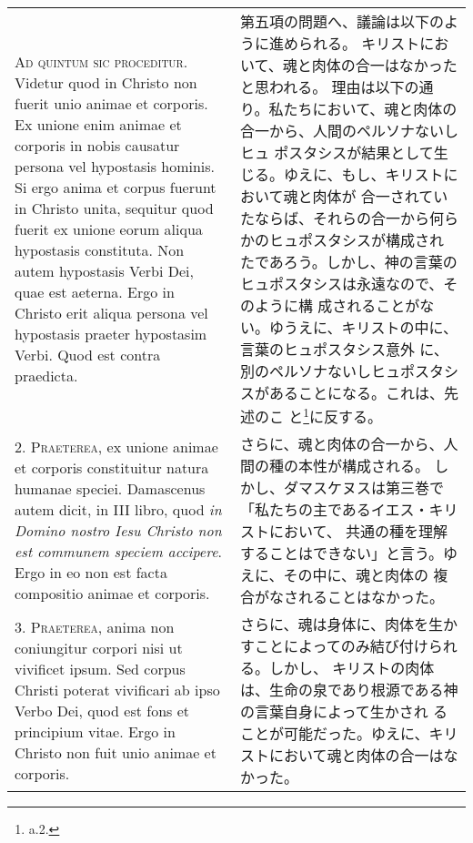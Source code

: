 \documentclass[10pt]{jsarticle} %
\begin{document}
\begin{longtable}{p{21em}p{21em}}


{\Huge A}{\scshape d quintum sic proceditur}. Videtur quod in Christo non fuerit unio
animae et corporis. Ex unione enim animae et corporis in nobis causatur
persona vel hypostasis hominis. Si ergo anima et corpus fuerunt in
Christo unita, sequitur quod fuerit ex unione eorum aliqua hypostasis
constituta. Non autem hypostasis Verbi Dei, quae est aeterna. Ergo in
Christo erit aliqua persona vel hypostasis praeter hypostasim
Verbi. Quod est contra praedicta.


&

第五項の問題へ、議論は以下のように進められる。
キリストにおいて、魂と肉体の合一はなかったと思われる。
理由は以下の通り。私たちにおいて、魂と肉体の合一から、人間のペルソナないしヒュ
 ポスタシスが結果として生じる。ゆえに、もし、キリストにおいて魂と肉体が
 合一されていたならば、それらの合一から何らかのヒュポスタシスが構成され
 たであろう。しかし、神の言葉のヒュポスタシスは永遠なので、そのように構
 成されることがない。ゆうえに、キリストの中に、言葉のヒュポスタシス意外
 に、別のペルソナないしヒュポスタシスがあることになる。これは、先述のこ
 と\footnote{a.2.}に反する。


\\



2. {\scshape Praeterea}, ex unione animae et corporis constituitur natura humanae
speciei. Damascenus autem dicit, in III libro, quod {\itshape in Domino nostro
Iesu Christo non est communem speciem accipere}. Ergo in eo non est facta
compositio animae et corporis.


&


さらに、魂と肉体の合一から、人間の種の本性が構成される。
しかし、ダマスケヌスは第三巻で「私たちの主であるイエス・キリストにおいて、
 共通の種を理解することはできない」と言う。ゆえに、その中に、魂と肉体の
 複合がなされることはなかった。

\\



3. {\scshape Praeterea}, anima non coniungitur corpori nisi ut vivificet ipsum. Sed
corpus Christi poterat vivificari ab ipso Verbo Dei, quod est fons et
principium vitae. Ergo in Christo non fuit unio animae et corporis.


&


さらに、魂は身体に、肉体を生かすことによってのみ結び付けられる。しかし、
 キリストの肉体は、生命の泉であり根源である神の言葉自身によって生かされ
 ることが可能だった。ゆえに、キリストにおいて魂と肉体の合一はなかった。



\end{longtable}
\end{document}
